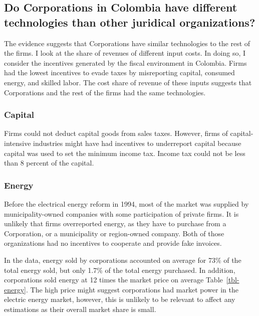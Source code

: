\documentclass[
  12pt]{article}
\theoremstyle{definition}
\theoremstyle{remark}
\begin{document}
\subsection{Do Corporations in Colombia have different technologies than
other juridical
organizations?}\label{do-corporations-in-colombia-have-different-technologies-than-other-juridical-organizations}

The evidence suggests that Corporations have similar technologies to the
rest of the firms. I look at the share of revenues of different input
costs. In doing so, I consider the incentives generated by the fiscal
environment in Colombia. Firms had the lowest incentives to evade taxes
by misreporting capital, consumed energy, and skilled labor. The cost
share of revenue of these inputs suggests that Corporations and the rest
of the firms had the same technologies.

\subsubsection{Capital}\label{capital}

Firms could not deduct capital goods from sales taxes. However, firms of
capital-intensive industries might have had incentives to underreport
capital because capital was used to set the minimum income tax. Income
tax could not be less than 8 percent of the capital.

\subsubsection{Energy}\label{energy}

Before the electrical energy reform in 1994, most of the market was
supplied by municipality-owned companies with some participation of
private firms. It is unlikely that firms overreported energy, as they
have to purchase from a Corporation, or a municipality or region-owned
company. Both of those organizations had no incentives to cooperate and
provide fake invoices.

In the data, energy sold by corporations accounted on average for 73\%
of the total energy sold, but only 1.7\% of the total energy purchased.
In addition, corporations sold energy at 12 times the market price on
average Table~\ref{tbl-energy}. The high price might suggest
corporations had market power in the electric energy market, however,
this is unlikely to be relevant to affect any estimations as their
overall market share is small.
\end{document}
